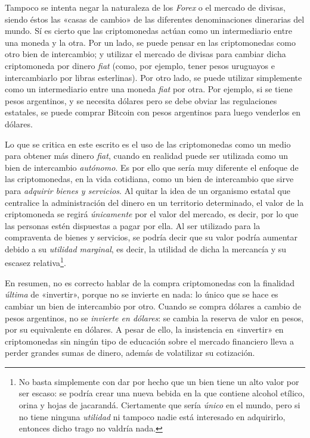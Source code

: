 \documentclass[12pt,a4paper,twoside]{book}
\begin{document}
Tampoco se intenta negar la naturaleza de los \textit{Forex} o el mercado de divisas, siendo éstos las «casas de cambio» de las diferentes denominaciones dinerarias del mundo. Sí es cierto que las criptomonedas actúan como un intermediario entre una moneda y la otra. Por un lado, se puede pensar en las criptomonedas como otro bien de intercambio; y utilizar el mercado de divisas para cambiar dicha criptomoneda por dinero \textit{fiat} (como, por ejemplo, tener pesos uruguayos e intercambiarlo por libras esterlinas). Por otro lado, se puede utilizar simplemente como un intermediario entre una moneda \textit{fiat} por otra. Por ejemplo, si se tiene pesos argentinos, y se necesita dólares pero se debe obviar las regulaciones estatales, se puede comprar Bitcoin con pesos argentinos para luego venderlos en dólares.

Lo que se critica en este escrito es el uso de las criptomonedas como un medio para obtener más dinero \textit{fiat}, cuando en realidad puede ser utilizada como un bien de intercambio \textit{autónomo}. Es por ello que sería muy diferente el enfoque de las criptomonedas, en la vida cotidiana, como un bien de intercambio que sirve para \textit{adquirir bienes y servicios}. Al quitar la idea de un organismo estatal que centralice la administración del dinero en un territorio determinado, el valor de la criptomoneda se regirá \textit{únicamente} por el valor del mercado, es decir, por lo que las personas estén dispuestas a pagar por ella. Al ser utilizado para la compraventa de bienes y servicios, se podría decir que su valor podría aumentar debido a su \textit{utilidad marginal}, es decir, la utilidad de dicha la mercancía y su escasez relativa\footnote{No basta simplemente con dar por hecho que un bien tiene un alto valor por ser escaso: se podría crear una nueva bebida en la que contiene alcohol etílico, orina y hojas de jacarandá. Ciertamente que sería \textit{único} en el mundo, pero si no tiene ninguna \textit{utilidad} ni tampoco nadie está interesado en adquirirlo, entonces dicho trago no valdría nada.}.

En resumen, no es correcto hablar de la compra criptomonedas con la finalidad \textit{última} de «invertir», porque no se invierte en nada: lo único que se hace es cambiar un bien de intercambio por otro. Cuando se compra dólares a cambio de pesos argentinos, no se \textit{invierte en dólares}: se cambia la reserva de valor en pesos, por su equivalente en dólares. A pesar de ello, la insistencia en «invertir» en criptomonedas sin ningún tipo de educación sobre el mercado financiero lleva a perder grandes sumas de dinero, además de volatilizar su cotización.
\end{document}
